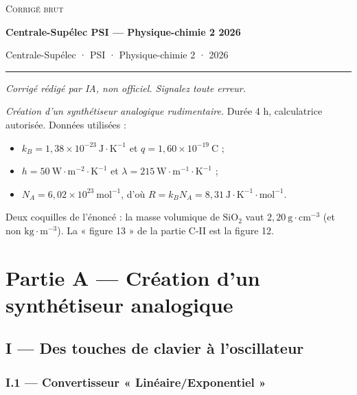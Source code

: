 \documentclass[11pt,a4paper]{article}
\providecommand{\tightlist}{\setlength{\itemsep}{0pt}\setlength{\parskip}{0pt}}
\begin{document}
\thispagestyle{plain}
\begin{center}
  {\small\scshape Corrigé brut}\par\smallskip
  {\LARGE\bfseries Centrale-Supélec PSI — Physique-chimie 2 2026\par}\medskip
  {\large Centrale-Supélec · PSI · Physique-chimie 2 · 2026\par}
\end{center}
\vspace{2pt}\hrule\vspace{8pt}

\emph{Corrigé rédigé par IA, non officiel. Signalez toute erreur.}

\emph{Création d'un synthétiseur analogique rudimentaire.} Durée 4 h, calculatrice autorisée. Données utilisées :

\begin{itemize}
\tightlist
\item
  \(k_B=1{,}38\times10^{-23}\ \mathrm{J\cdot K^{-1}}\) et \(q=1{,}60\times10^{-19}\ \mathrm{C}\) ;
\item
  \(h=50\ \mathrm{W\cdot m^{-2}\cdot K^{-1}}\) et \(\lambda=215\ \mathrm{W\cdot m^{-1}\cdot K^{-1}}\) ;
\item
  \(N_A=6{,}02\times10^{23}\ \mathrm{mol^{-1}}\), d'où \(R=k_BN_A=8{,}31\ \mathrm{J\cdot K^{-1}\cdot mol^{-1}}\).
\end{itemize}

Deux coquilles de l'énoncé : la masse volumique de \(\mathrm{SiO_2}\) vaut \(2{,}20\ \mathrm{g\cdot cm^{-3}}\) (et non \(\mathrm{kg\cdot m^{-3}}\)). La « figure 13 » de la partie C-II est la figure 12.

\hypertarget{partie-a-cruxe9ation-dun-synthuxe9tiseur-analogique}{%
\section{Partie A --- Création d'un synthétiseur analogique}\label{partie-a-cruxe9ation-dun-synthuxe9tiseur-analogique}}

\hypertarget{i-des-touches-de-clavier-uxe0-loscillateur}{%
\subsection{I --- Des touches de clavier à l'oscillateur}\label{i-des-touches-de-clavier-uxe0-loscillateur}}

\hypertarget{i.1-convertisseur-linuxe9aireexponentiel}{%
\subsubsection{I.1 --- Convertisseur « Linéaire/Exponentiel »}\label{i.1-convertisseur-linuxe9aireexponentiel}}
\end{document}
